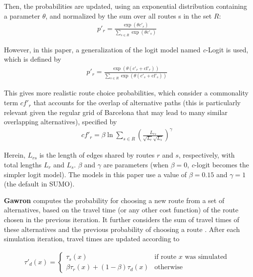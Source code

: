 Then, the probabilities are updated, using an exponential distribution containing a parameter $\theta$, and normalized by the sum over all routes s in the set $R$:
\begin{align}
    p'_r = \frac{\exp(\theta c'_r)}{\sum_{s \in R} \exp(\theta c'_s)} \label{eq:logit_update_prob}
\end{align}

However, in this paper, a generalization of the logit model named \emph{c}-Logit \citep{Cascetta1996} is used, which is defined by
\begin{align}
    p'_r = \frac{\exp(\theta (c'_r + \text{cf}'_r))}{\sum_{s \in R} \exp(\theta (c'_s + \text{cf}'_s))} \label{eq:c-logit}
\end{align}

This gives more realistic route choice probabilities, which consider a commonality term $cf'_r$ that accounts for the overlap of alternative paths (this is particularly relevant given the regular grid of Barcelona that may lead to many similar overlapping alternatives), specified by
\begin{align}
   cf'_r = \beta \ln \sum_{s \in R} \left( \frac{L_{rs}}{\sqrt{L_r} \sqrt{L_s}} \right)^\gamma \label{eq:c-logit_overlap_paths}
\end{align}

Herein, $L_{rs}$ is the length of edges shared by routes $r$ and $s$, respectively, with total lengths $L_r$ and $L_s$. $\beta$ and $\gamma$ are parameters (when $\beta=0$, \emph{c}-logit becomes the simpler logit model). The models in this paper use a value of $\beta=0.15$ and $\gamma=1$ (the default in SUMO).

\textbf{Gawron} computes the probability for choosing a new route from a set of alternatives, based on the travel time (or any other cost function) of the route chosen in the previous iteration. It further considers the sum of travel times of these alternatives and the previous probability of choosing a route \citep{Gawron1999}. After each simulation iteration, travel times are updated according to

\begin{align}
   \tau'_d(x) = \begin{cases} \tau_s(x) & \text{if route } x \text{ was simulated} \\ \beta \tau_r(x) + (1 - \beta)\tau_d(x) & \text{otherwise} \end{cases} \label{eq:GR_gawron}
\end{align}

